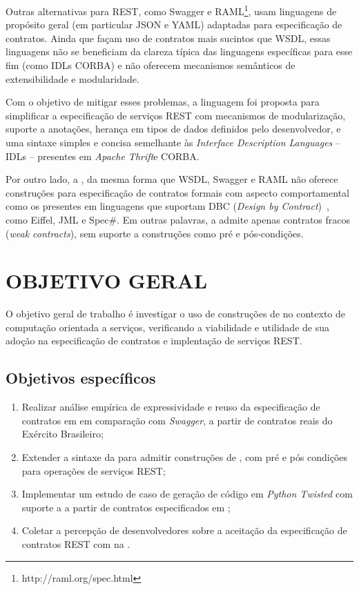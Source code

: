 Outras alternativas para REST, como Swagger e
RAML\footnote{http://raml.org/spec.html}, usam linguagens de propósito geral (em
particular JSON e YAML) adaptadas para especificação de contratos. Ainda que
façam uso de contratos mais sucintos que WSDL, essas linguagens não se
beneficiam da clareza típica das linguagens específicas para esse fim (como IDLs CORBA) e não oferecem
mecanismos semânticos de extensibilidade e modularidade.

Com o objetivo de mitigar esses problemas, a linguagem \neoidl{} foi proposta
para simplificar a especificação de serviços REST com mecanismos de modularização,
suporte a anotações, herança em tipos de dados definidos pelo desenvolvedor, e
uma sintaxe simples e concisa semelhante às \textit{Interface Description
Languages} -- IDLs -- presentes em \textit{Apache Thrift}\texttrademark e
CORBA\texttrademark.

Por outro lado, a \neoidl{}, da mesma forma que WSDL,
Swagger e RAML não oferece construções para especificação de contratos formais
com aspecto comportamental como os presentes em linguagens que
suportam DBC (\emph{Design by Contract})~\cite{meyer1992applying}, como
Eiffel, JML e Spec\#. Em outras palavras, a \neoidl{}  admite apenas
contratos fracos (\textit{weak contracts}), sem suporte a construções como pré e
pós-condições.



\section{OBJETIVO GERAL}
\vspace{-6mm}

O objetivo geral de trabalho é investigar o uso de construções de
\designbycontract{} no contexto de computação orientada a serviços, verificando a
viabilidade e utilidade de sua adoção na especificação de contratos e
implentação de serviços REST.

\subsection{Objetivos específicos}
\vspace{-6mm}

\begin{enumerate}
  \item Realizar análise empírica de expressividade e reuso da especificação de
  contratos em \neoidl{} em comparação com \textit{Swagger}, a partir de contratos
  reais do Exército Brasileiro;
  \item Extender a sintaxe da \neoidl{} para admitir construções de 
  \designbycontract, com pré e pós condições para operações de serviços REST;
  \item Implementar um estudo de caso de geração de código em \textit{Python
  Twisted} com suporte a \designbycontract{} a partir de contratos especificados
  em \neoidl;
  \item Coletar a percepção de desenvolvedores sobre a aceitação da
  especificação de contratos REST com \designbycontract{} na \neoidl{}.
\end{enumerate}


